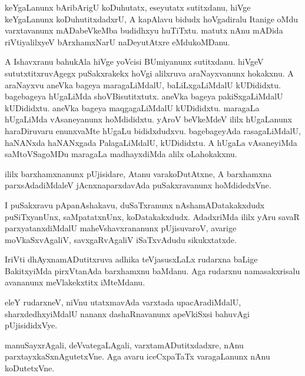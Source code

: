 \documentclass{article}
\begin{document}
\begin{mn}%
keYgaLanunx bAribArigU koDuhutatx, eseyutatx sutitxdanu, hiVge
keYgaLanunx koDuhutitxdadxrU, A kapAlavu bidudx hoVgadiralu Itanige
oMdu varxtavanunx mADabeVkeMba budidhxyu huTiTxtu. matutx nAnu mADida
riVtiyalilxyeV bArxhamxNarU naDeyutAtxre eMdukoMDanu.
\end{mn}

\begin{mn}%
A Ishavxranu bahukAla hiVge yoVcisi BUmiyanunx sutitxdanu. hiVgeV
sututxtitxruvAgegx puSakxrakekx hoVgi alilxruva araNayxvanunx
hokakxnu. A araNayxvu aneVka bageya maragaLiMdalU, baLiLxgaLiMdalU
kUDididxtu. bagebageya hUgaLiMda shoVBisutitxtutx. aneVka bageya
pakiSxgaLiMdalU kUDididxtu. aneVka bageya maqgagaLiMdalU
kUDididxtu. maragaLa hUgaLiMda vAsaneyanunx hoMdididxtu. yAroV
beVkeMdeV ililx hUgaLanunx haraDiruvaru enunxvaMte hUgaLu
bididxdudxvu. bagebageyAda rasagaLiMdalU, haNANxda haNANxgada
PalagaLiMdalU, kUDididxtu. A hUgaLa vAsaneyiMda saMtoVSagoMDu maragaLa
madhayxdiMda alilx oLahokakxnu.
\end{mn}

\begin{mn}%
ililx barxhamxnanunx pUjisidare, Atanu varakoDutAtxne, A barxhamxna
parxsAdadiMdaleV jAcnxnaparxdavAda puSakxravanunx hoMdidedxVne.
\end{mn}

\begin{mn}
I puSakxravu pApanAshakavu, duSaTxranunx nAshamADatakakxdudx
puSiTxyanUnx, saMpatatxnUnx, koDatakakxdudx. AdadxriMda ililx yAru
savaR parxyatanxdiMdalU maheVshavxrananunx pUjisuvaroV, avarige
moVkaSxvAgaliV, savxgaRvAgaliV iSaTxvAdudu sikukxtatxde.
\end{mn}

\begin{mn}
IriVti dhAyxnamADutitxruva adhika teVjasusxLaLx rudarxna baLige
BakitxyiMda pirxVtanAda barxhamxnu baMdanu. Aga rudarxnu
namasakxrisalu avananunx meVlakekxtitx iMteMdanu.
\end{mn}

\begin{mn}
eleY rudarxneV, niVnu utatxmavAda varxtada upacAradiMdalU,
sharxdedhxyiMdalU nananx dashaRnavanunx apeVkiSxsi bahuvAgi pUjisididxVye.
\end{mn}

\begin{mn}
manuSayxrAgali, deVvategaLAgali, varxtamADutitxdadxre, nAnu
parxtayxkaSxnAgutetxVne. Aga avaru iceCxpaTaTx varagaLanunx nAnu koDutetxVne.
\end{mn}
\end{document}
